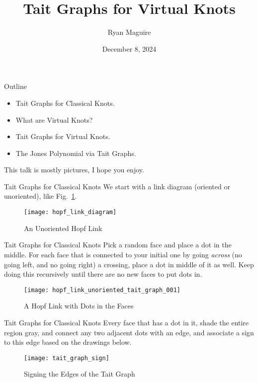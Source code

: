 \documentclass{beamer}
\title{Tait Graphs for Virtual Knots}
\author{Ryan Maguire}
\date{December 8, 2024}
\begin{document}
    \maketitle
    \begin{frame}{Outline}
        \begin{itemize}
            \item Tait Graphs for Classical Knots.
            \item What are Virtual Knots?
            \item Tait Graphs for Virtual Knots.
            \item The Jones Polynomial via Tait Graphs.
        \end{itemize}
        This talk is mostly pictures, I hope you enjoy.
    \end{frame}
    \begin{frame}{Tait Graphs for Classical Knots}
        We start with a link diagram (oriented or unoriented), like
        Fig.~\ref{fig:hopf_link_diagram}.
        \begin{figure}
            \centering
            \texttt{[image: hopf\_link\_diagram]}
            \label{fig:hopf_link_diagram}
            \caption{An Unoriented Hopf Link}
        \end{figure}
    \end{frame}
    \begin{frame}{Tait Graphs for Classical Knots}
        Pick a random face and place a dot in the middle. For each face that
        is connected to your initial one by going \textit{across} (no going
        left, and no going right) a crossing, place a dot in middle of it as
        well. Keep doing this recursively until there are no new faces to
        put dots in.
        \begin{figure}
            \centering
            \texttt{[image: hopf\_link\_unoriented\_tait\_graph\_001]}
            \label{fig:hopf_link_unoriented_tait_graph_001}
            \caption{A Hopf Link with Dots in the Faces}
        \end{figure}
    \end{frame}
    \begin{frame}{Tait Graphs for Classical Knots}
        Every face that has a dot in it, shade the entire region gray, and
        connect any two adjacent dots with an edge, and associate a sign to this
        edge based on the drawings below.
        \begin{figure}
            \centering
            \texttt{[image: tait\_graph\_sign]}
            \label{fig:tait_graph_sign}
            \caption{Signing the Edges of the Tait Graph}
        \end{figure}
    \end{frame}
\end{document}
